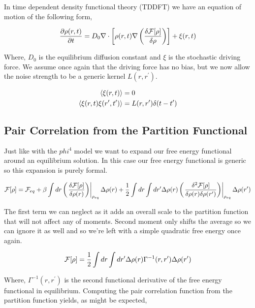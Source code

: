 In time dependent density functional theory (TDDFT) we have an equation of
motion of the following form,

\begin{equation} \frac{\partial \rho(r, t)}{\partial t} = D_0 \nabla \cdot
\left[\rho(r,t)\nabla \left(\frac{\delta \mathcal{F}[\rho]}{\delta \rho}\right)\right] + \xi(r, t) \end{equation}

Where, $D_0$ is the equilibrium diffusion constant and $\xi$ is the stochastic
driving force. We assume once again that the driving force has no bias, but we
now allow the noise strength to be a generic kernel $L(r, r^\prime)$.

\begin{align} \langle \xi(r,t) \rangle &= 0 \\ \left\langle \xi(r, t)
\xi(r^\prime, t^\prime) \right\rangle &= L(r, r^\prime) \delta (t -t^\prime)
\end{align}

\subsection{Pair Correlation from the Partition Functional}

Just like with the $phi^4$ model we want to expand our free energy functional
around an equilibrium solution. In this case our free energy functional is
generic so this expansion is purely formal.

\begin{equation} \mathcal{F}[\rho] = \mathcal{F}_{eq} + \beta\int dr \left(\left.\frac{\delta \mathcal{F}[\rho]}{\delta
\rho(r)}\right)\right\vert_{\rho_{eq}}\Delta\rho(r) + \frac{1}{2} \int dr \int dr^\prime
\Delta\rho(r) \left(\left.\frac{\delta^2 \mathcal{F}[\rho]}{\delta \rho(r) \delta
\rho(r^\prime)}\right)\right\vert_{\rho_{eq}} \Delta\rho(r^\prime) \end{equation}

The first term we can neglect as it adds an overall scale to the partition
function that will not affect any of moments. Second moment only shifts the
average so we can ignore it as well and so we're left with a simple quadratic
free energy once again.

\begin{equation} \mathcal{F}[\rho] = \frac{1}{2}\int dr \int dr^\prime \Delta \rho(r)
\Gamma^{-1}(r, r^\prime) \Delta \rho(r^\prime) \end{equation}

Where, $\Gamma^{-1}(r, r^\prime)$ is the second functional derivative of the
free energy functional in equilibrium. Computing the pair correlation function
from the partition function yields, as might be expected,

